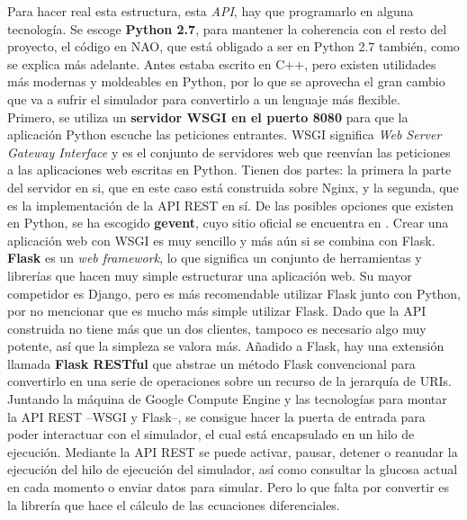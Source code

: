 \documentclass[12pt,spanish,listoffigures,listoftables]{tfgetsinf}
\begin{document}
Para hacer real esta estructura, esta \textit{API}, hay que programarlo en alguna tecnología. Se escoge \textbf{Python 2.7}, para mantener la coherencia con el resto del proyecto, el código en NAO, que está obligado a ser en Python 2.7 también, como se explica más adelante. Antes estaba escrito en C++, pero existen utilidades más modernas y moldeables en Python, por lo que se aprovecha el gran cambio que va a sufrir el simulador para convertirlo a un lenguaje más flexible. \\

Primero, se utiliza un \textbf{servidor WSGI en el puerto 8080} para que la aplicación Python escuche las peticiones entrantes. WSGI significa \textit{Web Server Gateway Interface} y es el conjunto de servidores web que reenvían las peticiones a las aplicaciones web escritas en Python. Tienen dos partes: la primera la parte del servidor en si, que en este caso está construida sobre Nginx, y la segunda, que es la implementación de la API REST en sí. De las posibles opciones que existen en Python, se ha escogido \textbf{gevent}, cuyo sitio oficial se encuentra en \cite{WSGIGevent}. Crear una aplicación web con WSGI es muy sencillo y más aún si se combina con Flask. \\

\textbf{Flask} es un \textit{web framework}, lo que significa un conjunto de herramientas y librerías que hacen muy simple estructurar una aplicación web. Su mayor competidor es Django, pero es más recomendable utilizar Flask junto con Python, por no mencionar que es mucho más simple utilizar Flask. Dado que la API construida no tiene más que un dos clientes, tampoco es necesario algo muy potente, así que la simpleza se valora más. Añadido a Flask, hay una extensión llamada \textbf{Flask RESTful} \cite{FlaskRESTful} que abstrae un método Flask convencional para convertirlo en una serie de operaciones sobre un recurso de la jerarquía de URIs.\\

Juntando la máquina de Google Compute Engine y las tecnologías para montar la API REST --WSGI y Flask--, se consigue hacer la puerta de entrada para poder interactuar con el simulador, el cual está encapsulado en un hilo de ejecución. Mediante la API REST se puede activar, pausar, detener o reanudar la ejecución del hilo de ejecución del simulador, así como consultar la glucosa actual en cada momento o enviar datos para simular. Pero lo que falta por convertir es la librería que hace el cálculo de las ecuaciones diferenciales.
\end{document}

